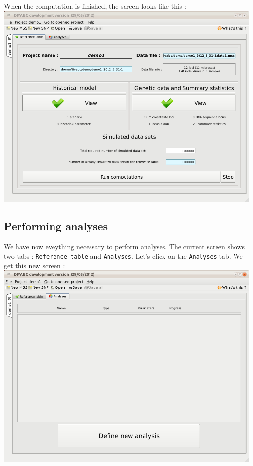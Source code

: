 When the computation is finished, the screen looks like this :\\

\includegraphics[scale=0.35]{gui_pictures/Capture-DIYABC-26.png} 

\subsection{Performing analyses}

We have now eveything necessary to perform analyses. The current screen shows two tabs : \texttt{Reference table} and \texttt{Analyses}. Let's click on the \texttt{Analyses} tab. We get this new screen :\\

\includegraphics[scale=0.35]{gui_pictures/Capture-DIYABC-27.png} 

